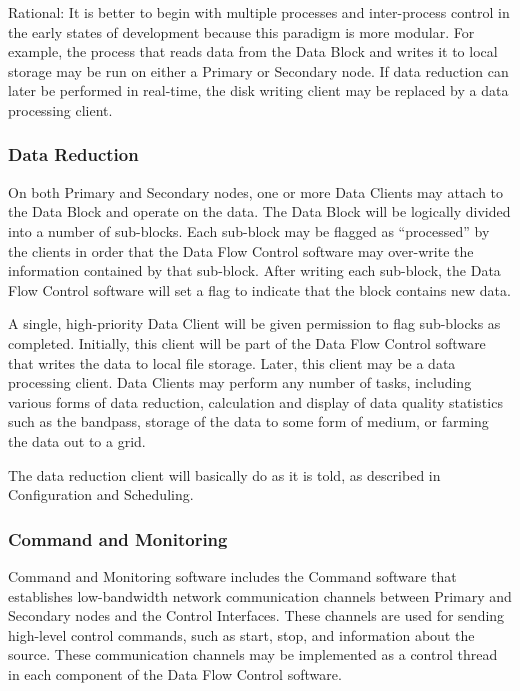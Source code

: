 Rational: It is better to begin with multiple processes and
inter-process control in the early states of development because this
paradigm is more modular.  For example, the process that reads data
from the Data Block and writes it to local storage may be run on
either a Primary or Secondary node.  If data reduction can later be
performed in real-time, the disk writing client may be replaced by a
data processing client.

\subsubsection{Data Reduction}

On both Primary and Secondary nodes, one or more Data Clients may
attach to the Data Block and operate on the data.  The Data Block will
be logically divided into a number of sub-blocks.  Each sub-block may
be flagged as ``processed'' by the clients in order that the Data Flow
Control software may over-write the information contained by that
sub-block.  After writing each sub-block, the Data Flow Control
software will set a flag to indicate that the block contains new data.

A single, high-priority Data Client will be given permission to flag
sub-blocks as completed.  Initially, this client will be part of the
Data Flow Control software that writes the data to local file storage.
Later, this client may be a data processing client.  Data Clients may
perform any number of tasks, including various forms of data
reduction, calculation and display of data quality statistics such as
the bandpass, storage of the data to some form of medium, or farming
the data out to a grid.

The data reduction client will basically do as it is told, as
described in Configuration and Scheduling.

\subsubsection{Command and Monitoring}

Command and Monitoring software includes the Command software that
establishes low-bandwidth network communication channels between
Primary and Secondary nodes and the Control Interfaces.  These
channels are used for sending high-level control commands, such as
start, stop, and information about the source.  These communication
channels may be implemented as a control thread in each component of
the Data Flow Control software. 

